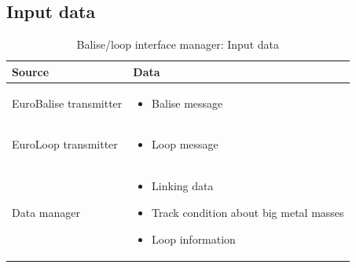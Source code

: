 \documentclass[nocc]{template/openetcs_report}
\begin{document}
\subsection{Input data}
			\begin{longtable}{|l|l|}
				\caption{Balise/loop interface manager: Input data}\\ 
				\hline
				
					\begin{minipage}[t]{0.35\linewidth} \textbf{Source}	\end{minipage} 
				&	\begin{minipage}[t]{0.65\linewidth} \textbf{Data} \end{minipage} \\
				
				\hline
																																									
					\begin{minipage}[t]{0.35\linewidth} EuroBalise transmitter	\end{minipage} 
				&	\begin{minipage}[t]{0.65\linewidth}
						\begin{itemize}
							\item Balise message
						\end{itemize}
					\end{minipage} \\
				
				\hline
				
					\begin{minipage}[t]{0.35\linewidth} EuroLoop transmitter	\end{minipage} 
				&	\begin{minipage}[t]{0.65\linewidth}
						\begin{itemize}
							\item Loop message
						\end{itemize}
					\end{minipage} \\
				
				\hline		
						
					\begin{minipage}[t]{0.35\linewidth} Data manager	\end{minipage} 
				&	\begin{minipage}[t]{0.65\linewidth}
						\begin{itemize}
							\item Linking data
							\item Track condition about big metal masses
							\item Loop information
						\end{itemize}
					\end{minipage} \\
				

\end{longtable}
\end{document}

